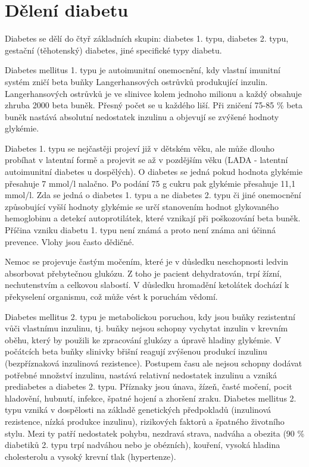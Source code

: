 \section{Dělení diabetu}

Diabetes se dělí do čtyř základních skupin: diabetes 1. typu, diabetes 2. typu, gestační (těhotenský) diabetes, jiné specifické typy diabetu.

Diabetes mellitus 1. typu je autoimunitní onemocnění, kdy vlastní imunitní systém zničí beta buňky Langerhansových ostrůvků produkující inzulin. Langerhansových ostrůvků je ve slinivce kolem jednoho milionu a každý obsahuje zhruba 2000 beta buněk. Přesný počet se u každého liší. Při zničení 75-85 \% beta buněk nastává absolutní nedostatek inzulinu a objevují se zvýšené hodnoty glykémie.

Diabetes 1. typu se nejčastěji projeví již v dětském věku, ale může dlouho probíhat v latentní formě a projevit se až v pozdějším věku (LADA - latentní autoimunitní diabetes u dospělých). O diabetes se jedná pokud hodnota glykémie přesahuje 7 mmol/l nalačno. Po podání 75 g cukru pak glykémie přesahuje 11,1 mmol/l. Zda se jedná o diabetes 1. typu a ne diabetes 2. typu či jiné onemocnění způsobující vyšší hodnoty glykémie se určí stanovením hodnot glykovaného hemoglobinu a detekcí autoprotilátek, které vznikají při poškozování beta buněk. Příčina vzniku diabetu 1. typu není známá a proto není známa ani účinná prevence. Vlohy jsou často dědičné.

Nemoc se projevuje častým močením, které je v důsledku neschopnosti ledvin absorbovat přebytečnou glukózu. Z toho je pacient dehydratován, trpí žízní, nechutenstvím a celkovou slabostí. V důsledku hromadění ketolátek dochází k překyselení organismu, což může vést k poruchám vědomí. 

Diabetes mellitus 2. typu je metabolickou poruchou, kdy jsou buňky rezistentní vůči vlastnímu inzulinu, tj. buňky nejsou schopny vychytat inzulin v krevním oběhu, který by použili ke zpracování glukózy a úpravě hladiny glykémie. V počátcích beta buňky slinivky břišní reagují zvýšenou produkcí inzulinu (bezpříznaková inzulinová rezistence). Postupem času ale nejsou schopny dodávat potřebné množství inzulinu, nastává relativní nedostatek inzulinu a vzniká prediabetes a diabetes 2. typu. Příznaky jsou únava, žízeň, časté močení, pocit hladovění, hubnutí, infekce, špatné hojení a zhoršení zraku. Diabetes mellitus 2. typu vzniká v dospělosti na základě genetických předpokladů (inzulinová rezistence, nízká produkce inzulinu), rizikových faktorů a špatného životního stylu. Mezi ty patří nedostatek pohybu, nezdravá strava, nadváha a obezita (90 \% diabetiků 2. typu trpí nadváhou nebo je obézních), kouření, vysoká hladina cholesterolu a vysoký krevní tlak (hypertenze).

